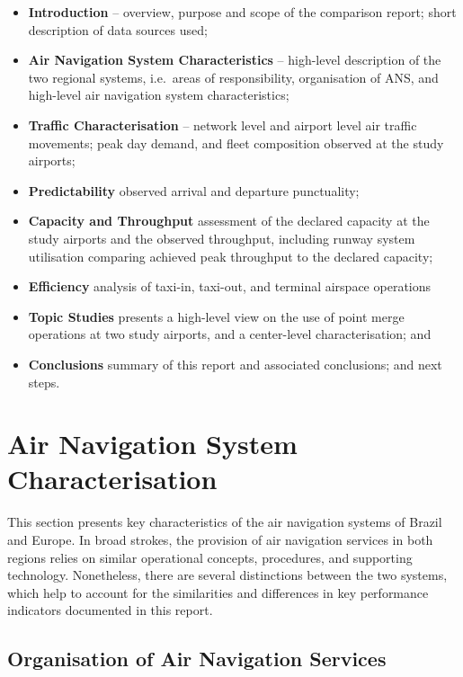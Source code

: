 \documentclass[
  a4paper,
  DIV=11,
  numbers=noendperiod]{scrreport}
\providecommand{\tightlist}{%
  \setlength{\itemsep}{0pt}\setlength{\parskip}{0pt}}\usepackage{longtable,booktabs,array}
\begin{document}
\begin{itemize}
\tightlist
\item
  \textbf{Introduction} -- overview, purpose and scope of the comparison
  report; short description of data sources used;
\item
  \textbf{Air Navigation System Characteristics} -- high-level
  description of the two regional systems, i.e.~areas of responsibility,
  organisation of ANS, and high-level air navigation system
  characteristics;
\item
  \textbf{Traffic Characterisation} -- network level and airport level
  air traffic movements; peak day demand, and fleet composition observed
  at the study airports;
\item
  \textbf{Predictability} observed arrival and departure punctuality;
\item
  \textbf{Capacity and Throughput} assessment of the declared capacity
  at the study airports and the observed throughput, including runway
  system utilisation comparing achieved peak throughput to the declared
  capacity;
\item
  \textbf{Efficiency} analysis of taxi-in, taxi-out, and terminal
  airspace operations
\item
  \textbf{Topic Studies} presents a high-level view on the use of point
  merge operations at two study airports, and a center-level
  characterisation; and
\item
  \textbf{Conclusions} summary of this report and associated
  conclusions; and next steps.
\end{itemize}


\chapter{Air Navigation System
Characterisation}\label{air-navigation-system-characterisation}

This section presents key characteristics of the air navigation systems
of Brazil and Europe. In broad strokes, the provision of air navigation
services in both regions relies on similar operational concepts,
procedures, and supporting technology. Nonetheless, there are several
distinctions between the two systems, which help to account for the
similarities and differences in key performance indicators documented in
this report.

\section{Organisation of Air Navigation
Services}\label{organisation-of-air-navigation-services}
\end{document}
